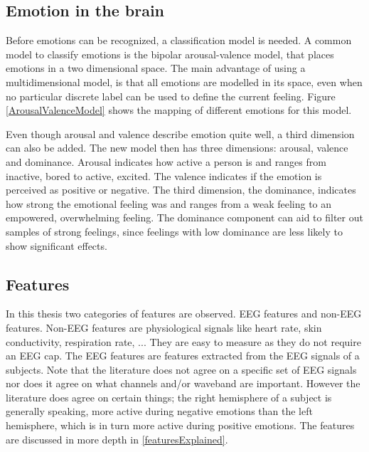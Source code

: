 \subsection{Emotion in the brain}
\label{valarrdomspace}

Before emotions can be recognized, a classification model is needed. A common model to classify emotions is the bipolar arousal-valence model\cite{ExtendedPaper,RealTimeEEGEmotion}, that places emotions in a two dimensional space. The main advantage of using a multidimensional model, is that all emotions are modelled in its space, even when no particular discrete label can be used to define the current feeling. Figure \ref{ArousalValenceModel} shows the mapping of different emotions for this model. 

\npar
Even though arousal and valence describe emotion quite well, a third dimension can also be added. The new model then has three dimensions: arousal, valence and dominance. Arousal indicates how active a person is and ranges from inactive, bored to active, excited. The valence indicates if the emotion is perceived as positive or negative. The third dimension, the dominance, indicates how strong the emotional feeling was and ranges from a weak feeling to an empowered, overwhelming feeling. The dominance component can aid to filter out samples of strong feelings, since feelings with low dominance are less likely to show significant effects.


\subsection{Features}
In this thesis two categories of features are observed. EEG features and non-EEG features. Non-EEG features are physiological signals like heart rate, skin conductivity, respiration rate, ... They are easy to measure as they do not require an EEG cap. The EEG features are features extracted from the EEG signals of a subjects. Note that the literature does not agree on a specific set of EEG signals nor does it agree on what channels and/or waveband are important. However the literature does agree on certain things; the right hemisphere of a subject is generally speaking, more active during negative emotions than the left hemisphere, which is in turn more active during positive emotions\cite{RealTimeEEGEmotion,EEGDatasets,killyPaper}. The features are discussed in more depth in \ref{featuresExplained}.

